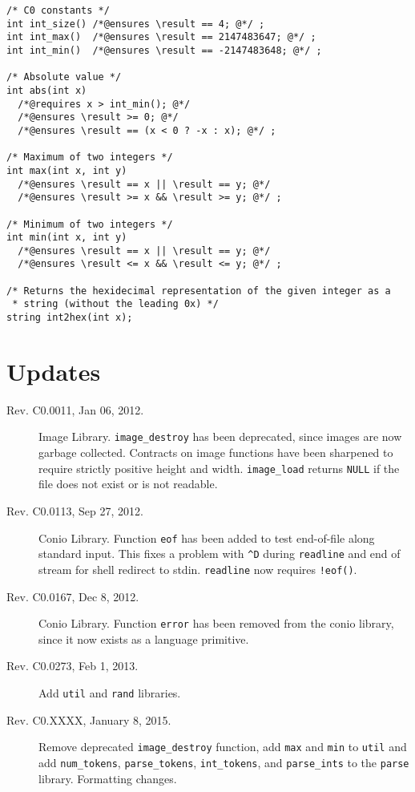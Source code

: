 \documentclass[11pt]{article}
\begin{document}
\begin{small}
\begin{verbatim}
/* C0 constants */
int int_size() /*@ensures \result == 4; @*/ ;
int int_max()  /*@ensures \result == 2147483647; @*/ ;
int int_min()  /*@ensures \result == -2147483648; @*/ ;

/* Absolute value */
int abs(int x)
  /*@requires x > int_min(); @*/
  /*@ensures \result >= 0; @*/
  /*@ensures \result == (x < 0 ? -x : x); @*/ ;

/* Maximum of two integers */
int max(int x, int y)
  /*@ensures \result == x || \result == y; @*/
  /*@ensures \result >= x && \result >= y; @*/ ;

/* Minimum of two integers */
int min(int x, int y)
  /*@ensures \result == x || \result == y; @*/ 
  /*@ensures \result <= x && \result <= y; @*/ ;

/* Returns the hexidecimal representation of the given integer as a
 * string (without the leading 0x) */ 
string int2hex(int x);
\end{verbatim}
\end{small}

\section{Updates}
\label{sec:updates}
\hypertarget{sec:updates}{}

\begin{description}
\item[Rev. C0.0011, Jan 06, 2012.]  Image Library.
  \verb'image_destroy' has been deprecated, since images are now
  garbage collected.  Contracts on image functions have been sharpened
  to require strictly positive height and width.  \verb'image_load'
  returns \verb'NULL' if the file does not exist or is not readable.
\item[Rev. C0.0113, Sep 27, 2012.]  Conio Library.
  Function \verb'eof' has been added to test end-of-file along
  standard input.  This fixes a problem with \verb'^D' during
  \verb'readline' and end of stream for shell redirect to stdin.
  \verb'readline' now requires \verb'!eof()'.
\item[Rev. C0.0167, Dec 8, 2012.]  Conio Library.
  Function \verb'error' has been removed from the conio library, since
  it now exists as a language primitive.
\item[Rev. C0.0273, Feb 1, 2013.]  Add \verb'util' and \verb'rand' libraries.
\item[Rev. C0.XXXX, January 8, 2015.]  Remove deprecated
  \verb'image_destroy' function, add \verb'max' and \verb'min' to
  \verb'util' and add \verb'num_tokens', \verb'parse_tokens',
  \verb'int_tokens', and \verb'parse_ints' to the \verb'parse'
  library. Formatting changes.
\end{description}
\end{document}
